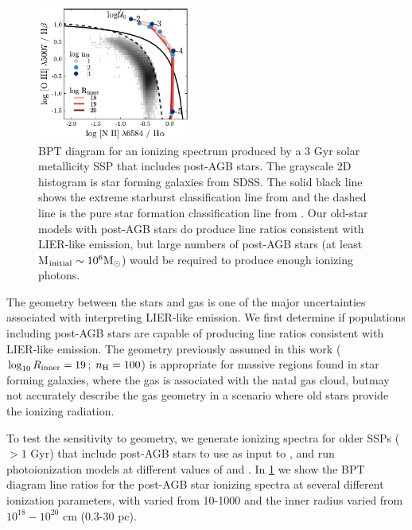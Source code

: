 \begin{figure}[!htbp]
  \begin{centering}
    \includegraphics[width=0.45\textwidth]{manuscript/chapter2/f27.pdf}
    \caption{BPT diagram for an ionizing spectrum produced by a 3 Gyr solar metallicity SSP that includes post-AGB stars. The grayscale 2D histogram is star forming galaxies from SDSS. The solid black line shows the extreme starburst classification line from \citet{Kewley01} and the dashed line is the pure star formation classification line from \citet{Kauffmann03a}. Our old-star models with post-AGB stars do produce line ratios consistent with LIER-like emission, but large numbers of post-AGB stars (at least M$_{\mathrm{initial}} \sim 10^6\mathrm{M_{\odot}}{}$) would be required to produce enough ionizing photons.}
    \label{fig:pAGBBPT}
  \end{centering}
\end{figure}

The geometry between the stars and gas is one of the major uncertainties associated with interpreting LIER-like emission. We first determine if populations including post-AGB stars are capable of producing line ratios consistent with LIER-like emission. The geometry previously assumed in this work ($\log_{10} R_{\mathrm{inner}} = 19$; $n_{\mathrm{H}} = 100$) is appropriate for massive \hii regions found in star forming galaxies, where the gas is associated with the natal gas cloud, butmay not accurately describe the gas geometry in a scenario where old stars provide the ionizing radiation.

To test the sensitivity to geometry, we generate ionizing spectra for older SSPs ($>1$ Gyr) that include post-AGB stars to use as input to \Cloudy, and run photoionization models at different values of \Rin{} and \nH{}. In \ref{fig:pAGBBPT} we show the BPT diagram line ratios for the post-AGB star ionizing spectra at several different ionization parameters, with \nH varied from 10-1000 and the inner radius varied from $10^{18}-10^{20}$ cm (0.3-30 pc). 


